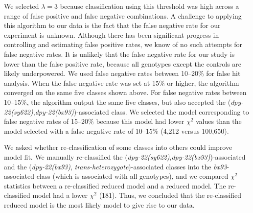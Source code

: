 \documentclass[8pt, twocolumn]{article}
\newcommand{\gene}[1]{\mbox{\emph{#1}}}
\newcommand{\dpy}[1]{\gene{dpy-22#1}}
\newcommand{\bx}{\dpy{(bx93)}}
\newcommand{\sy}{\dpy{(sy622)}}
\begin{document}
We selected $\lambda=3$ because classification using this threshold was high
across a range of false positive and false negative combinations. A challenge to
applying this algorithm to our data is the fact that the false negative rate for
our experiment is unknown. Although there has been significant progress in
controlling and estimating false positive rates, we know of no such attempts for
false negative rates. It is unlikely that the false negative rate for our study
is lower than the false positive rate, because all genotypes except the controls
are likely underpowered. We used false negative rates between 10--20\% for false
hit analysis. When the false negative rate was set at 15\% or higher, the
algorithm converged on the same five classes shown above. For false negative
rates between 10--15\%, the algorithm output the same five classes, but also
accepted the (\sy{},\bx{})-associated class. We selected the model corresponding
to false negative rates of 15--20\% because this model had lower $\chi^2$ values
than the model selected with a false negative rate of 10--15\% (4,212 versus
100,650).

We asked whether re-classification of some classes into others could improve
model fit. We manually re-classified the (\sy{},\bx{})-associated and the (\bx,
\emph{trans-heterozygote})-associated classes into the \emph{bx93}-associated
class (which is associated with all genotypes), and we compared $\chi^2$
statistics between a re-classified reduced model and a reduced model. The
re-classified model had a lower $\chi^2$ (181). Thus, we concluded that the
re-classified reduced model is the most likely model to give rise to our data.
\end{document}
